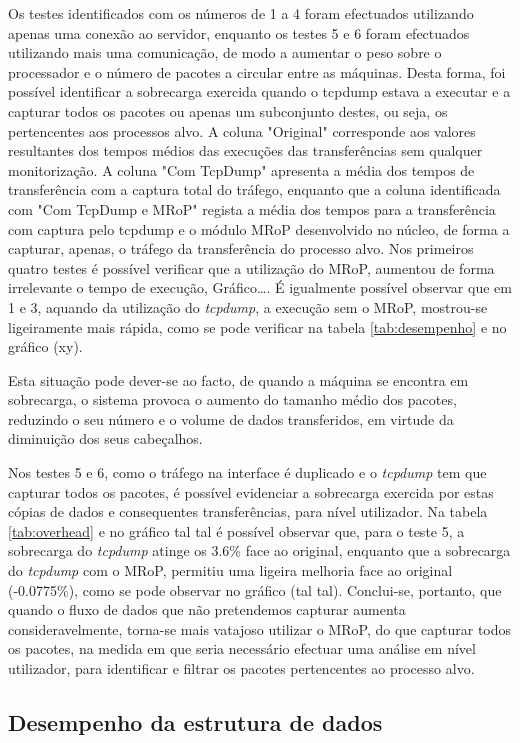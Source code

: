 Os testes identificados com os números de 1 a 4 foram efectuados utilizando apenas uma conexão ao servidor, enquanto os testes 5 e 6 foram efectuados utilizando mais uma comunicação, de modo a aumentar o peso sobre o processador e o número de pacotes a circular entre as máquinas.
Desta forma, foi possível identificar a sobrecarga exercida quando o tcpdump estava a executar e a capturar todos os pacotes ou apenas um subconjunto destes, ou seja, os pertencentes aos processos alvo.
A coluna "Original" corresponde aos valores resultantes dos tempos médios das execuções das transferências sem qualquer monitorização.
A coluna "Com TcpDump" apresenta a média dos tempos de transferência com a captura total do tráfego, enquanto que a coluna identificada com "Com TcpDump e MRoP" regista a média dos tempos para a transferência com captura pelo tcpdump e o módulo MRoP desenvolvido no núcleo, de forma a capturar, apenas, o tráfego da transferência do processo alvo.
Nos primeiros quatro testes é possível verificar que a utilização do MRoP, aumentou de forma irrelevante o tempo de execução, Gráfico….
É igualmente possível observar que em 1 e 3, aquando da utilização do \textit{tcpdump}, a execução sem o MRoP, mostrou-se ligeiramente mais rápida, como se pode verificar na tabela \ref{tab:desempenho} e no gráfico (xy).


Esta situação pode dever-se ao facto, de quando a máquina se encontra em sobrecarga, o sistema provoca o aumento do tamanho médio dos pacotes, reduzindo o seu número e o volume de dados transferidos, em virtude da diminuição dos seus cabeçalhos.

Nos testes 5 e 6, como o tráfego na interface é duplicado e o \textit{tcpdump} tem que capturar todos os pacotes, é possível evidenciar a sobrecarga exercida por estas cópias de dados e consequentes transferências, para nível utilizador.
Na tabela \ref{tab:overhead} e no gráfico tal tal é possível observar que, para o teste 5, a sobrecarga do \textit{tcpdump} atinge os 3.6\% face ao original, enquanto que a sobrecarga do \textit{tcpdump} com o MRoP, permitiu uma ligeira melhoria face ao original (-0.0775\%), como se pode observar no gráfico (tal tal).
Conclui-se, portanto, que quando o fluxo de dados que não pretendemos capturar aumenta consideravelmente, torna-se mais vatajoso utilizar o MRoP, do que capturar todos os pacotes, na medida em que seria necessário efectuar uma análise em nível utilizador, para identificar e filtrar os pacotes pertencentes ao processo alvo.

\subsection{Desempenho da estrutura de dados}

